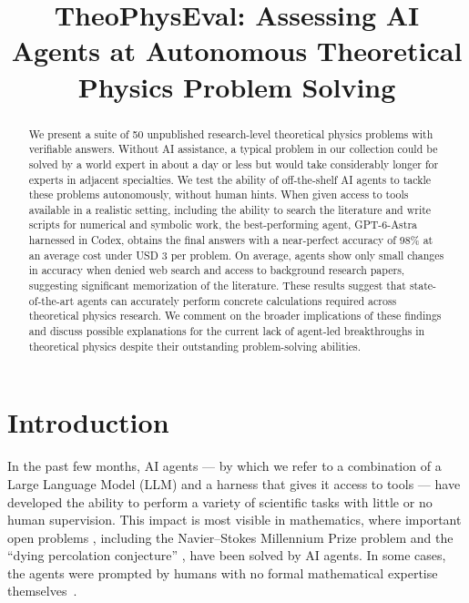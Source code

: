 \documentclass[aps,prd,reprint,superscriptaddress,nofootinbib]{revtex4-2}
\begin{document}
\title{TheoPhysEval: Assessing AI Agents at Autonomous Theoretical Physics Problem Solving}


\begin{abstract}
We present a suite of 50 unpublished research-level theoretical physics problems with verifiable answers. Without AI assistance, a typical problem in our collection could be solved by a world expert in about a day or less but would take considerably longer for experts in adjacent specialties.  We test the ability of off-the-shelf AI agents to tackle these problems autonomously, without human hints. When given access to  tools available in a realistic setting, including the ability to search the literature and write scripts for numerical and symbolic work, the best-performing agent, GPT-6-Astra harnessed in Codex, obtains the final answers with a near-perfect accuracy of 98\% at an average cost under USD 3 per problem. On average, agents show only small changes in accuracy when denied web search and access to background research papers, suggesting significant memorization of the literature. These results suggest that state-of-the-art agents can accurately perform concrete calculations required across theoretical physics research. We comment on the broader implications of these findings and discuss possible explanations for the current lack of agent-led breakthroughs in theoretical physics despite their outstanding problem-solving abilities.
\end{abstract}
\maketitle
\section{Introduction}
In the past few months, AI agents --- by which we refer to a combination of a Large Language Model (LLM) and a harness that gives it access to tools ---  have developed the ability to perform a variety of scientific tasks with little or no human supervision. This impact is most visible in mathematics, where important open problems  \mbox{\cite{Georgiev2025MathematicalDiscovery,Sothanaphan2026Erdos728,Alon2026UnitDistance,openai2026mathprogress}}, including the Navier--Stokes Millennium Prize problem \cite{openai2026navierstokes} and the ``dying percolation conjecture'' \cite{leder2026percolation}, have been solved by AI agents. In some cases, the agents were prompted by humans with no formal mathematical expertise themselves~\cite{giraudin2026counterexample}.
 
\end{document}

